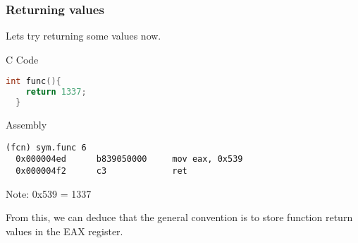 \documentclass{beamer}
\begin{document}
\begin{frame}[fragile]
  \frametitle{Returning values}
  Lets try returning some values now.
  \begin{block}{C Code}
  \begin{lstlisting}[language=C, basicstyle=\small\ttfamily]
  int func(){
    return 1337;
  }
  \end{lstlisting}
\end{block}

\begin{block}{Assembly}
\begin{lstlisting}[basicstyle=\ttfamily]
(fcn) sym.func 6
  0x000004ed      b839050000     mov eax, 0x539
  0x000004f2      c3             ret
\end{lstlisting}
Note: 0x539 = 1337
\end{block}
From this, we can deduce that the general convention is to store
function return values in the EAX register.
\end{frame}
\end{document}
